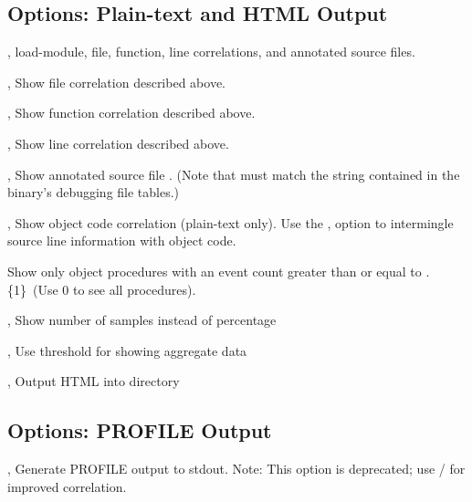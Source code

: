 \documentclass[english]{article}
\begin{document}
\subsection{Options: Plain-text and HTML Output}
\begin{Description}
  \item[\Opt{-e}, \Opt{--everything}] load-module, file, function, line correlations, and annotated source files.
  \item[\Opt{-f}, \Opt{--files}] Show file correlation described above.
  \item[\Opt{-r}, \Opt{--funcs}] Show function correlation described above.
  \item[\Opt{-l}, \Opt{--lines}] Show line correlation described above.
  \item[\OptArg{-a}{file}, \OptArg{--annotate}{file}] Show annotated source file .  (Note that  must match the string contained in the binary's debugging file tables.)

  \item[\Opt{-o}, \Opt{--object}] Show object code correlation (plain-text only).  Use the ,  option to intermingle source line information with object code.
  \item[\Opt{--othreshold}] Show only object procedures with an event count greater than or equal to .  \{1\}\  (Use 0 to see all procedures).

  \item[\Opt{-n}, \Opt{--number}] Show number of samples instead of percentage
  \item[\OptArg{-s}{n}, \OptArg{--show}{n}] Use threshold  for showing aggregate data
  \item[\OptArg{-H}{dir}, \OptArg{--html}{dir}] Output HTML into directory 
\end{Description}

\subsection{Options: PROFILE Output}
\begin{Description}
  \item[\Opt{-p}, \Opt{--profile}] Generate PROFILE output to stdout. Note: This option is deprecated; use / for improved correlation.
\end{Description}



\end{document}
